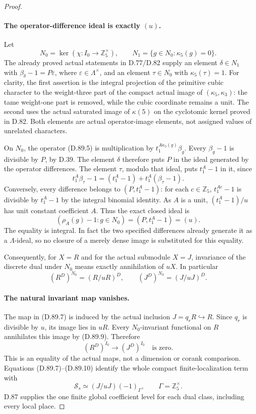 \begin{proof}
\paragraph{The operator-difference ideal is exactly \((u)\).}
Let
\[
 N_0=\ker(\chi:I_0\to\mathbb Z_5^\times),\qquad
 N_1=\{g\in N_0:\kappa_5(g)=0\}.
\]
The already proved actual statements in D.77/D.82 supply
an element \(\delta\in N_1\) with
\(\beta_\delta-1=P\varepsilon\), where
\(\varepsilon\in\Lambda^\times\), and an element
\(\tau\in N_0\) with \(\kappa_5(\tau)=1\).
For clarity, the first assertion is the integral projection
of the primitive cubic character to the weight-three part of
the compact actual image of \((\kappa_5,\kappa_3)\):
the tame weight-one part is removed, while the cubic coordinate
remains a unit. The second uses the actual saturated image of
\(\kappa(5)\) on the cyclotomic kernel proved in D.82.
Both elements are actual operator-image elements, not assigned
values of unrelated characters.

On \(N_0\), the operator (D.89.5) is multiplication by
\(t_1^{A\kappa_5(g)}\beta_g\). Every \(\beta_g-1\)
is divisible by \(P\), by D.39. The element \(\delta\)
therefore puts \(P\) in the ideal generated by the operator
differences. The element \(\tau\), modulo that ideal,
puts \(t_1^A-1\) in it, since
\[
 t_1^A\beta_\tau-1=(t_1^A-1)+t_1^A(\beta_\tau-1).
\]
Conversely, every difference belongs to
\((P,t_1^A-1)\): for each \(c\in\mathbb Z_5\),
\(t_1^{Ac}-1\) is divisible by \(t_1^A-1\) by the
integral binomial identity. As \(A\) is a unit,
\((t_1^A-1)/u\) has unit constant coefficient \(A\).
Thus the exact closed ideal is
\[
       (\rho_A(g)-1:g\in N_0)=(P,t_1^A-1)=(u).         \tag{D.89.8}
\]
The equality is integral. In fact the two specified differences
already generate it as a \(\Lambda\)-ideal, so no closure
of a merely dense image is substituted for this equality.

Consequently, for \(X=R\) and for the actual submodule
\(X=J\), invariance of the discrete dual under \(N_0\)
means exactly annihilation of \(uX\). In particular
\[
                (R^D)^{N_0}=(R/uR)^D,
                \qquad (J^D)^{N_0}=(J/uJ)^D.            \tag{D.89.9}
\]

\paragraph{The natural invariant map vanishes.}
The map in (D.89.7) is induced by the actual inclusion
\(J=q_rR\hookrightarrow R\). Since \(q_r\) is
divisible by \(u\), its image lies in \(uR\).
Every \(N_0\)-invariant functional on \(R\) annihilates
this image by (D.89.9). Therefore
\[
                 (R^D)^{I_0}\longrightarrow(J^D)^{I_0}
                           \quad\text{is zero}.        \tag{D.89.10}
\]
This is an equality of the actual maps, not a dimension or
corank comparison. Equations (D.89.7)--(D.89.10) identify
the whole compact finite-localization term with
\[
                   \mathcal S_s\simeq(J/uJ)(-1)_\Gamma,
                   \qquad\Gamma=\mathbb Z_5^\times.    \tag{D.89.11}
\]
D.87 supplies the one finite global coefficient level for
each dual class, including every local place.


\end{proof}
